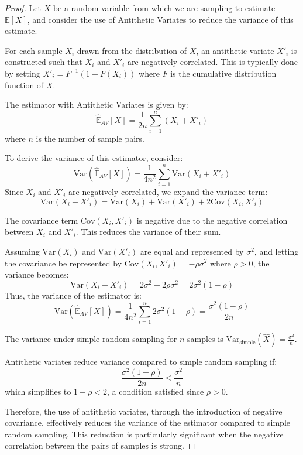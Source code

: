 \documentclass{report}
\begin{document}
\begin{proof}
    Let \( X \) be a random variable from which we are sampling to estimate \( \mathbb{E}[X] \), and consider the use of Antithetic Variates to reduce the variance of this estimate.

       For each sample \( X_i \) drawn from the distribution of \( X \), an antithetic variate \( X'_i \) is constructed such that \( X_i \) and \( X'_i \) are negatively correlated. This is typically done by setting \( X'_i = F^{-1}(1 - F(X_i)) \) where \( F \) is the cumulative distribution function of \( X \).

       The estimator with Antithetic Variates is given by:
       \[ \hat{\mathbb{E}}_{AV}[X] = \frac{1}{2n} \sum_{i=1}^{n} (X_i + X'_i) \]
       where \( n \) is the number of sample pairs.

       To derive the variance of this estimator, consider:
       \[ \mathrm{Var}(\hat{\mathbb{E}}_{AV}[X]) = \frac{1}{4n^2} \sum_{i=1}^{n} \mathrm{Var}(X_i + X'_i) \]
       Since \( X_i \) and \( X'_i \) are negatively correlated, we expand the variance term:
       \[ \mathrm{Var}(X_i + X'_i) = \mathrm{Var}(X_i) + \mathrm{Var}(X'_i) + 2\mathrm{Cov}(X_i, X'_i) \]

       The covariance term \( \mathrm{Cov}(X_i, X'_i) \) is negative due to the negative correlation between \( X_i \) and \( X'_i \). This reduces the variance of their sum.

       Assuming \( \mathrm{Var}(X_i) \) and \( \mathrm{Var}(X'_i) \) are equal and represented by \( \sigma^2 \), and letting the covariance be represented by \( \mathrm{Cov}(X_i, X'_i) = -\rho\sigma^2 \) where \( \rho > 0 \), the variance becomes:
       \[ \mathrm{Var}(X_i + X'_i) = 2\sigma^2 - 2\rho\sigma^2 = 2\sigma^2(1 - \rho) \]
    Thus, the variance of the estimator is:
    \[ \mathrm{Var}(\hat{\mathbb{E}}_{AV}[X]) = \frac{1}{4n^2} \sum_{i=1}^{n} 2\sigma^2(1 - \rho) = \frac{\sigma^2(1 - \rho)}{2n} \]

    The variance under simple random sampling for \( n \) samples is \( \mathrm{Var}_{\text{simple}}(\hat{X}) = \frac{\sigma^2}{n} \).

    Antithetic variates reduce variance compared to simple random sampling if:
    \[ \frac{\sigma^2(1 - \rho)}{2n} < \frac{\sigma^2}{n} \]
    which simplifies to \( 1 - \rho < 2 \), a condition satisfied since \( \rho > 0 \).

    Therefore, the use of antithetic variates, through the introduction of negative covariance, effectively reduces the variance of the estimator compared to simple random sampling. This reduction is particularly significant when the negative correlation between the pairs of samples is strong.
\end{proof}
\end{document}
